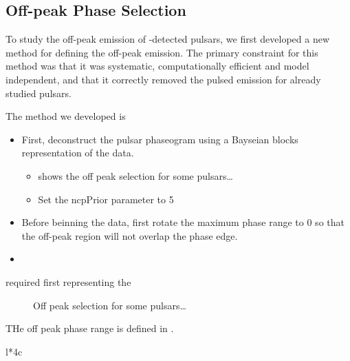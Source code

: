 \subsection{Off-peak Phase Selection}


To study the off-peak emission of \lat-detected pulsars, we first
developed a new method for defining the off-peak emission.
The primary constraint for this method was that it was systematic,
computationally efficient and model independent, and that it correctly
removed the pulsed emission for already studied pulsars.

The method we developed is
\begin{itemize}
  \item First, deconstruct the pulsar phaseogram 
    using a Bayseian blocks representation of the data.
    \begin{itemize}
      \item {} shows the off peak selection for some pulsars\dots
      \item Set the ncpPrior parameter to 5
    \end{itemize}
  \item Before beinning the data, first rotate the maximum phase range to 0
    so that the off-peak region will not overlap the phase edge.
  \item 
\end{itemize}
  required first representing the 


\begin{figure}
  \ifdefined\bwfigures
  \else
  \fi
  \caption{Off peak selection for some pulsars\dots}
  \label{fig:off_peak_select}
\end{figure}


THe off peak phase range is defined in .


\begin{deluxetable}{l*{4}c}
  \tabletypesize{\scriptsize}
  
\end{deluxetable}

